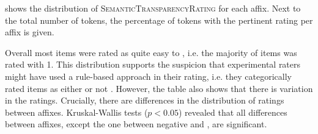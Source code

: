  shows the distribution of \textsc{SemanticTransparencyRating} for each affix. Next to the total number of tokens, the percentage of tokens with the pertinent rating per affix is given. 


\begin{table}

	\caption{Semantic Transparency Rating  by affix }
	\label{tbl:Exp distribution semantic transparency rating}
	
	
\end{table}

Overall most  items were rated as quite easy to , i.e. the majority of items was rated with 1. This distribution supports the suspicion that experimental raters might have used a rule-based approach in their rating, i.e. they categorically rated items as either  or not . 
However, the table also shows that there is variation in the ratings. 
Crucially, there are differences in the distribution of ratings between affixes. Kruskal-Wallis tests ($p<0.05$) revealed that all differences between affixes, except the one between negative  and , are significant.



